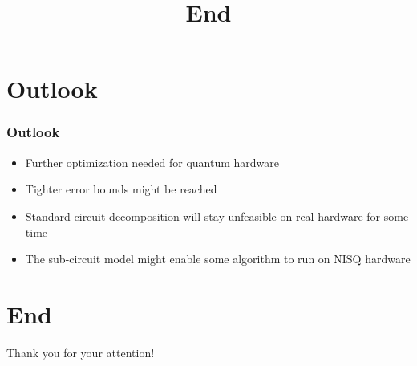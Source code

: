 \documentclass[10pt,a4paper]{beamer}
\begin{document}
\section{Outlook}
\begin{frame}
\frametitle{Outlook}
\begin{itemize}
	\item Further optimization needed for quantum hardware
	\item Tighter error bounds might be reached
	\item Standard circuit decomposition will stay unfeasible on real hardware for some time
	\item The sub-circuit model might enable some algorithm to run on NISQ hardware
\end{itemize}
\end{frame}

\section{End}
\begin{frame}
\title{End}
	\begin{center}
		Thank you for your attention!
	\end{center}
\end{frame}
\end{document}
